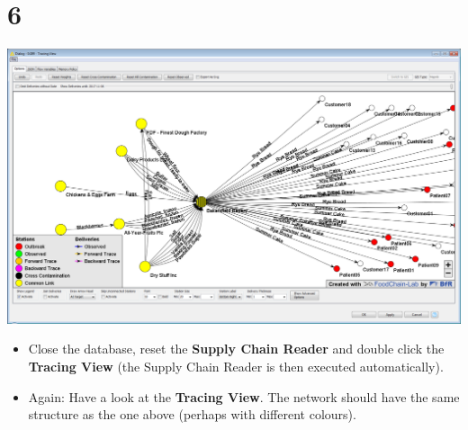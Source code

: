 \documentclass[10pt]{beamer}
\begin{document}
\section{6}
\begin{frame}
	\begin{center}
			\includegraphics[height=0.6\textheight]{6.png}
	\end{center}
	\begin{itemize}
		\item Close the database, reset the \textbf{Supply Chain Reader} and double click the \textbf{Tracing View} (the Supply Chain Reader is then executed automatically).
		\item Again: Have a look at the \textbf{Tracing View}. The network should have the same structure as the one above (perhaps with different colours).
	\end{itemize}
\end{frame}
\end{document}
